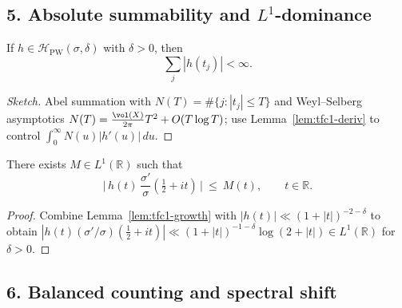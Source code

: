 \subsection*{5. Absolute summability and $L^1$-dominance}\relax\hspace{0pt}
\label{subsec:tfc1-absL1} %

\begin{theorem}\relax\hspace{0pt}
\label{thm:tfc1-absdisc} %
If $h\in\mathcal{H}_{\mathrm{PW}}(\sigma,\delta)$ with $\delta>0$, then
\[
\sum_{j}|h(t_j)|<\infty.
\]
\end{theorem}

\begin{proof}[Sketch]\relax\hspace{0pt}
Abel summation with $N(T)=\#\{j:|t_j|\le T\}$ and Weyl--Selberg asymptotics $N(T)=\frac{\vol(X)}{2\pi}T^2+O(T\log T)$; use Lemma~\ref{lem:tfc1-deriv} to control $\int_0^\infty N(u)|h'(u)|\,du$.\relax\hspace{0pt}
\end{proof}

\begin{proposition}\relax\hspace{0pt}
\label{prop:tfc1-L1} %
There exists $M\in L^1(\mathbb{R})$ such that
\[
\big|\,h(t)\,\frac{\sigma'}{\sigma}(\tfrac12+it)\,\big|\ \le\ M(t),\qquad t\in\mathbb{R}.
\]
\end{proposition}

\begin{proof}\relax\hspace{0pt}
Combine Lemma~\ref{lem:tfc1-growth} with $|h(t)|\ll (1+|t|)^{-2-\delta}$ to obtain $|h(t)(\sigma'/\sigma)(\tfrac12+it)|\ll (1+|t|)^{-1-\delta}\log(2+|t|)\in L^1(\mathbb{R})$ for $\delta>0$.\relax\hspace{0pt}
\end{proof}

\subsection*{6. Balanced counting and spectral shift}\relax\hspace{0pt}
\label{subsec:tfc1-balance} %

